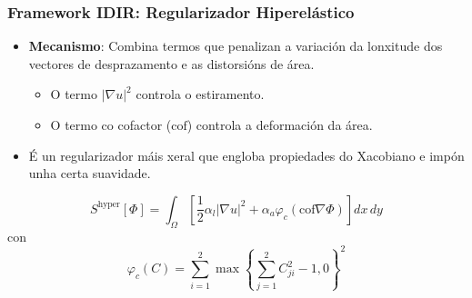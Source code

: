 \documentclass[xcolor=dvipsnames]{beamer}
\begin{document}
\begin{frame}
\frametitle{Framework IDIR: Regularizador Hiperelástico}

\begin{itemize}
    \item \textbf{Mecanismo}: Combina termos que penalizan a variación da lonxitude dos vectores de desprazamento e as distorsións de área.
     \begin{itemize}
        \item O termo $|\nabla u|^2$ controla o estiramento.
        \item O termo co cofactor ($\text{cof}$) controla a deformación da área.
     \end{itemize}
    \vspace{0.3cm}
    \item É un regularizador máis xeral que engloba propiedades do Xacobiano e impón unha certa suavidade.
\end{itemize}

\vfill %

\centering
$$
S^{\text{hyper}}[\Phi] = \int_{\Omega} \left[ \frac{1}{2} \alpha_l |\nabla u|^2 + \alpha_a \varphi_c (\text{cof} \nabla \Phi) \right] dx \, dy
$$
\vspace{0.2cm}
\small
con
$$
\varphi_c(C) = \sum_{i=1}^2 \max \left\{ \sum_{j=1}^2 C_{ji}^2 - 1, 0 \right\}^2
$$


\end{frame}
\end{document}
